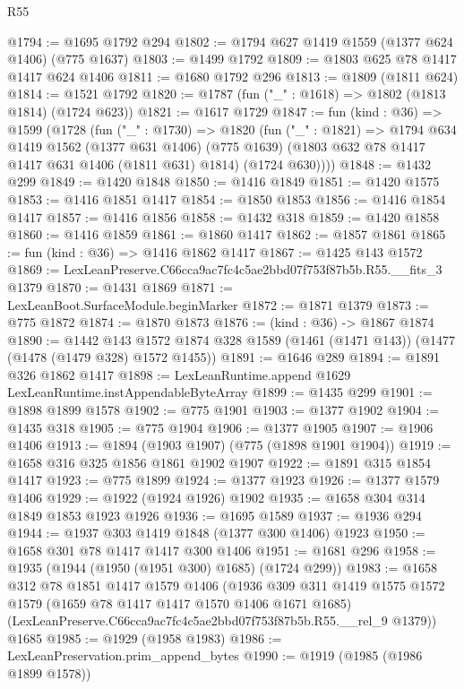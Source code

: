 \begin{lexlean}{R55}
\begin{coremodule}
{{@1794 := @1695 @1792 @294
@1802 := @1794 @627 @1419 @1559 (@1377 @624 @1406) (@775 @1637)
@1803 := @1499 @1792
@1809 := @1803 @625 @78 @1417 @1417 @624 @1406
@1811 := @1680 @1792 @296
@1813 := @1809 (@1811 @624)
@1814 := @1521 @1792
@1820 := @1787 (fun ("_" : @1618) => @1802 (@1813 @1814) (@1724 @623))
@1821 := @1617 @1729
@1847 := fun (kind : @36) =>
  @1599
    (@1728
      (fun ("_" : @1730) =>
      @1820
        (fun ("_" : @1821) =>
        @1794
          @634
          @1419
          @1562
          (@1377 @631 @1406)
          (@775 @1639)
          (@1803 @632 @78 @1417 @1417 @631 @1406 (@1811 @631) @1814)
          (@1724 @630))))
@1848 := @1432 @299
@1849 := @1420 @1848
@1850 := @1416 @1849
@1851 := @1420 @1575
@1853 := @1416 @1851 @1417
@1854 := @1850 @1853
@1856 := @1416 @1854 @1417
@1857 := @1416 @1856
@1858 := @1432 @318
@1859 := @1420 @1858
@1860 := @1416 @1859
@1861 := @1860 @1417
@1862 := @1857 @1861
@1865 := fun (kind : @36) => @1416 @1862 @1417
@1867 := @1425 @143 @1572
@1869 := LexLeanPreserve.C66cca9ac7fc4c5ae2bbd07f753f87b5b.R55.__fits_3 @1379
@1870 := @1431 @1869
@1871 := LexLeanBoot.SurfaceModule.beginMarker
@1872 := @1871 @1379
@1873 := @775 @1872
@1874 := @1870 @1873
@1876 := (kind : @36) -> @1867 @1874
@1890 := @1442
    @143
    @1572
    @1874
    @328
    @1589
    (@1461 (@1471 @143))
    (@1477 (@1478 (@1479 @328) @1572 @1455))
@1891 := @1646 @289
@1894 := @1891 @326 @1862 @1417
@1898 := LexLeanRuntime.append @1629 LexLeanRuntime.instAppendableByteArray
@1899 := @1435 @299
@1901 := @1898 @1899 @1578
@1902 := @775 @1901
@1903 := @1377 @1902
@1904 := @1435 @318
@1905 := @775 @1904
@1906 := @1377 @1905
@1907 := @1906 @1406
@1913 := @1894 (@1903 @1907) (@775 (@1898 @1901 @1904))
@1919 := @1658 @316 @325 @1856 @1861 @1902 @1907
@1922 := @1891 @315 @1854 @1417
@1923 := @775 @1899
@1924 := @1377 @1923
@1926 := @1377 @1579 @1406
@1929 := @1922 (@1924 @1926) @1902
@1935 := @1658 @304 @314 @1849 @1853 @1923 @1926
@1936 := @1695 @1589
@1937 := @1936 @294
@1944 := @1937 @303 @1419 @1848 (@1377 @300 @1406) @1923
@1950 := @1658 @301 @78 @1417 @1417 @300 @1406
@1951 := @1681 @296
@1958 := @1935 (@1944 (@1950 (@1951 @300) @1685) (@1724 @299))
@1983 := @1658
    @312
    @78
    @1851
    @1417
    @1579
    @1406
    (@1936
      @309
      @311
      @1419
      @1575
      @1572
      @1579
      (@1659 @78 @1417 @1417 @1570 @1406 @1671 @1685)
      (LexLeanPreserve.C66cca9ac7fc4c5ae2bbd07f753f87b5b.R55.__rel_9 @1379))
    @1685
@1985 := @1929 (@1958 @1983)
@1986 := LexLeanPreservation.prim_append_bytes
@1990 := @1919 (@1985 (@1986 @1899 @1578))
}}
\end{coremodule}
\end{lexlean}
